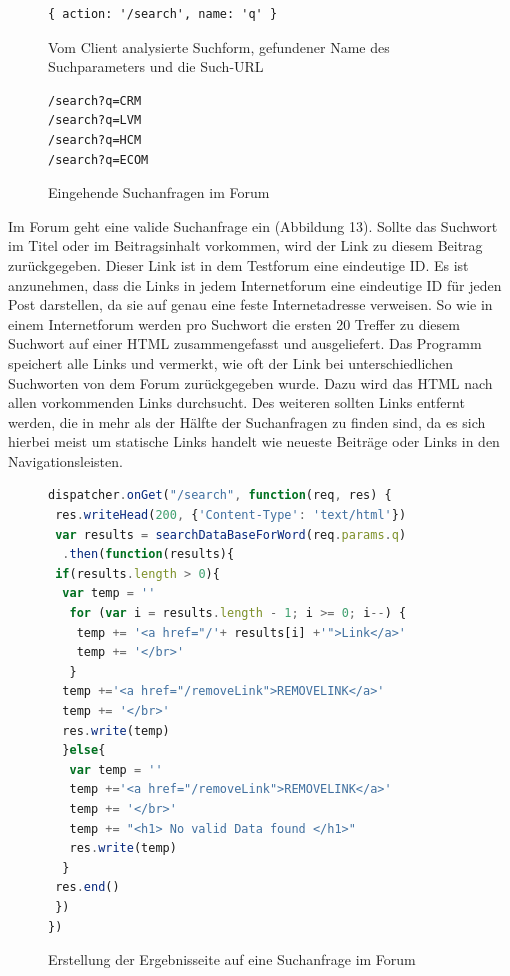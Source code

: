 \begin{figure}[ht]
\begin{lstlisting}[language=HTML5]
{ action: '/search', name: 'q' }
\end{lstlisting}
\caption{Vom Client analysierte Suchform, gefundener Name des Suchparameters und die Such-URL}
\end{figure}

\newpage


\begin{figure}[ht]
\begin{lstlisting}[language=HTML5]
/search?q=CRM
/search?q=LVM
/search?q=HCM
/search?q=ECOM
\end{lstlisting}
\caption{Eingehende Suchanfragen im Forum }
\end{figure}
Im Forum geht eine valide Suchanfrage ein (Abbildung 13).
Sollte das Suchwort im Titel oder im Beitragsinhalt vorkommen, wird der Link zu diesem Beitrag zurückgegeben. Dieser Link ist in dem Testforum eine eindeutige ID. Es ist anzunehmen, dass die Links in jedem Internetforum eine eindeutige ID für jeden Post darstellen, da sie auf genau eine feste Internetadresse verweisen. So wie in einem Internetforum werden pro Suchwort die ersten 20 Treffer zu diesem Suchwort auf einer HTML zusammengefasst und ausgeliefert. Das Programm speichert alle Links und vermerkt, wie oft der Link bei unterschiedlichen Suchworten von dem Forum zurückgegeben wurde. Dazu wird das HTML nach allen vorkommenden Links durchsucht. Des weiteren sollten Links entfernt werden, die in mehr als der Hälfte der Suchanfragen zu finden sind, da es sich hierbei meist um statische Links handelt wie neueste Beiträge oder Links in den Navigationsleisten.
\newpage

\begin{figure}[h!]
\begin{lstlisting}[language=JavaScript]
dispatcher.onGet("/search", function(req, res) {
 res.writeHead(200, {'Content-Type': 'text/html'})
 var results = searchDataBaseForWord(req.params.q)
  .then(function(results){
 if(results.length > 0){
  var temp = ''
   for (var i = results.length - 1; i >= 0; i--) {
    temp += '<a href="/'+ results[i] +'">Link</a>'
    temp += '</br>'
   }
  temp +='<a href="/removeLink">REMOVELINK</a>'
  temp += '</br>'
  res.write(temp)
  }else{
   var temp = ''
   temp +='<a href="/removeLink">REMOVELINK</a>'
   temp += '</br>'
   temp += "<h1> No valid Data found </h1>"
   res.write(temp)
  }
 res.end() 
 }) 
})
\end{lstlisting}
\caption{Erstellung der Ergebnisseite auf eine Suchanfrage im Forum}
\end{figure}

